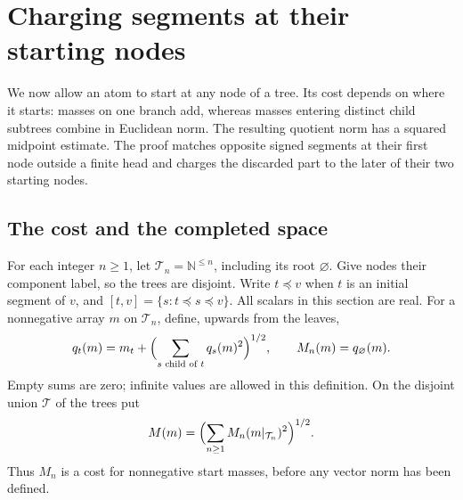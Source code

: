 \section{Charging segments at their starting nodes}\label{sm:s:section}

We now allow an atom to start at any node of a tree. Its cost depends on
where it starts: masses on one branch add, whereas masses entering distinct
child subtrees combine in Euclidean norm. The resulting quotient norm has
a squared midpoint estimate. The proof matches opposite signed segments
at their first node outside a finite head and charges the discarded part
to the later of their two starting nodes.

\subsection{The cost and the completed space}

For each integer $n\ge1$, let $\mathcal T_n=\mathbb N^{\le n}$, including
its root $\varnothing$. Give nodes their component label, so the trees are
disjoint. Write $t\preceq v$ when $t$ is an initial segment of $v$, and
$[t,v]=\{s:t\preceq s\preceq v\}$. All scalars in this section are real.
For a nonnegative array $m$ on $\mathcal T_n$, define, upwards from the
leaves,
\begin{equation}\label{sm:s:cost}
 q_t(m)=m_t+\Bigl(\sum_{s\text{ child of }t}q_s(m)^2\Bigr)^{1/2},
 \qquad M_n(m)=q_{\varnothing}(m).
\end{equation}
Empty sums are zero; infinite values are allowed in this definition.
On the disjoint union $\mathcal T$ of the trees put
\[
 M(m)=\Bigl(\sum_{n\ge1}M_n(m|_{\mathcal T_n})^2\Bigr)^{1/2}.
\]
Thus $M_n$ is a cost for nonnegative start masses, before any vector norm
has been defined.

